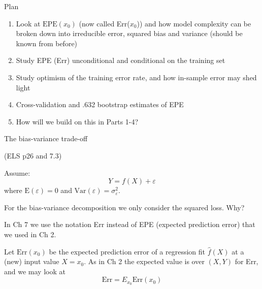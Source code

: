 \documentclass[
  ignorenonframetext,
]{beamer}
\providecommand{\tightlist}{%
  \setlength{\itemsep}{0pt}\setlength{\parskip}{0pt}}
\begin{document}
\begin{frame}

\begin{block}{Plan}

\begin{enumerate}
[1)]
\tightlist
\item
  Look at \(\text{EPE}(x_0)\) (now called Err(\(x_0\))) and how model
  complexity can be broken down into irreducible error, squared bias and
  variance (should be known from before)
\item
  Study EPE (Err) unconditional and conditional on the training set
\item
  Study optimism of the training error rate, and how in-sample error may
  shed light
\item
  Cross-validation and .632 bootstrap estimates of EPE
\item
  How will we build on this in Parts 1-4?
\end{enumerate}

\end{block}

\end{frame}

\begin{frame}

\begin{block}{The bias-variance trade-off}

(ELS p26 and 7.3)

Assume: \[ Y=f(X)+\varepsilon\] where \(\text{E}(\varepsilon)=0\) and
\(\text{Var}(\varepsilon)=\sigma_{\varepsilon}^2\).

For the bias-variance decomposition we only consider the squared loss.
Why?

In Ch 7 we use the notation Err instead of EPE (expected prediction
error) that we used in Ch 2.

Let \(\text{Err}(x_0)\) be the expected prediction error of a regression
fit \(\hat{f}(X)\) at a (new) input value \(X=x_0\). As in Ch 2 the
expected value is over \((X,Y)\) for Err, and we may look at
\[ \text{Err}=E_{x_0} \text{Err}(x_0)\]

\end{block}

\end{frame}
\end{document}

